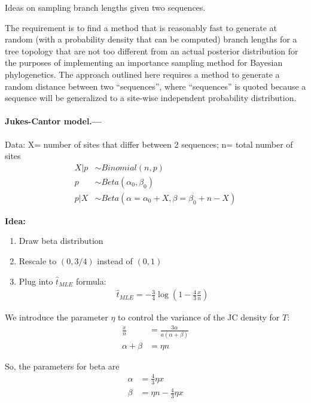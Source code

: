 \documentclass[12pt,letterpaper]{article}
\begin{document}
\begin{center}
Ideas on sampling branch lengths given two sequences.
\end{center}

The requirement is to find a method that is reasonably fast
to generate at random (with a probability density that can be computed)
branch lengths for a tree topology that are not too different from an actual posterior distribution
for the purposes of implementing an importance sampling method for Bayesian phylogenetics.
The approach outlined here requires a method to generate a random distance between two ``sequences'',
where ``sequences'' is quoted because a sequence will be generalized to a site-wise independent probability distribution.

\paragraph{Jukes-Cantor model.---}
Data: X= number of sites that differ between 2 sequences; n= total
number of sites
\begin{align*}
X|p &\sim Binomial(n,p)\\
p &\sim Beta(\alpha_0,\beta_0)\\
p|X &\sim Beta(\alpha=\alpha_0+X,\beta=\beta_0+n-X)
\end{align*}

\textbf{Idea:}
\begin{enumerate}
\item Draw beta distribution
\item Rescale to $(0,3/4)$ instead of $(0,1)$
\item Plug into $\hat{t}_{MLE}$ formula:
\begin{align*}
\hat{t}_{MLE}=-\frac{3}{4} \log \left( 1- \frac{4}{3} \frac{x}{n} \right)
\end{align*}
\end{enumerate}

We introduce the parameter $\eta$ to control the variance of the JC
density for $T$:
\begin{align*}
\frac{x}{n}&=\frac{3\alpha}{a(\alpha+\beta)}\\
\alpha+\beta &= \eta n
\end{align*}

So, the parameters for beta are
\begin{align*}
\alpha&=\frac{4}{3}\eta x \\
\beta&=\eta n - \frac{4}{3} \eta x
\end{align*}
\end{document}
